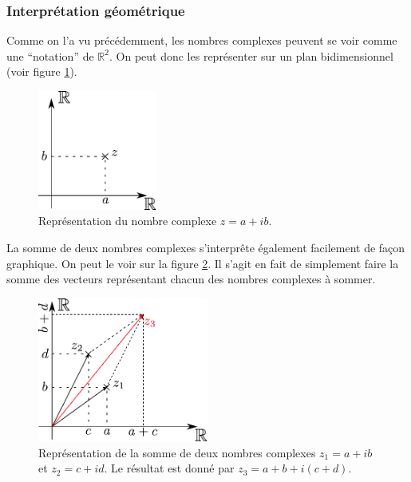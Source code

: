\documentclass[a4paper,12pt]{book}
\newcommand{\real}{\mathbb{R}}
\begin{document}
\subsubsection{Interprétation géométrique}

Comme on l'a vu précédemment, les nombres complexes peuvent se voir comme une ``notation'' 
de $\real^2$. On peut donc les représenter sur un plan bidimensionnel (voir figure \ref{fig_complexPlane}).
\begin{figure}[htp]
\begin{center}
\includegraphics[width=0.35\textwidth]{figs/complexPlane.pdf}
\end{center}
\caption{Représentation du nombre complexe $z=a+ib$.}\label{fig_complexPlane}
\end{figure}
La somme de deux nombres complexes s'interprête également facilement
de façon graphique. On peut le voir sur la figure \ref{fig_complexPlaneSum}. Il s'agit en fait de simplement
faire la somme des vecteurs représentant chacun des nombres complexes à sommer.
\begin{figure}[htp]
\begin{center}
\includegraphics[width=0.5\textwidth]{figs/complexPlaneSum.pdf}
\end{center}
\caption{Représentation de la somme de deux nombres complexes $z_1=a+ib$ et $z_2=c+id$. Le résultat est donné par $z_3=a+b+i(c+d)$.}\label{fig_complexPlaneSum}
\end{figure}
\end{document}
